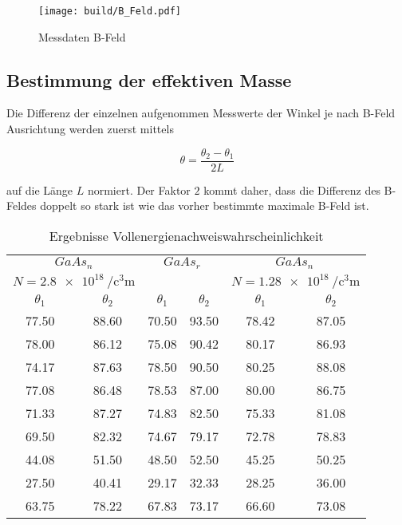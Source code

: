 \begin{figure}[H]
	\centering
	\texttt{[image: build/B\_Feld.pdf]}
	\caption{Messdaten B-Feld}\label{fig:B_Feld}
\end{figure}

\subsection{Bestimmung der effektiven Masse}
Die Differenz der einzelnen aufgenommen Messwerte der Winkel je nach B-Feld Ausrichtung werden zuerst mittels 

\begin{equation}
    \theta=\frac{\theta_2 - \theta_1}{2L} 
\end{equation}

auf die Länge $L$ normiert. 
Der Faktor $2$ kommt daher, dass die Differenz des B-Feldes doppelt so stark ist wie das vorher bestimmte maximale B-Feld ist. 

\begin{table}[H]
	\centering
	\caption{Ergebnisse Vollenergienachweiswahrscheinlichkeit}
	\begin{tabular}{|c c | c c | c c|}
		\toprule
		\multicolumn{2}{|c|}{$GaAs_n$}  & \multicolumn{2}{|c|}{$GaAs_r \, $}  & \multicolumn{2}{|c|}{$GaAs_n \, $}   \\
        \multicolumn{2}{|c|}{$N=\qty[per-mode=fraction]{2.8e18}{\per\cubic\centi\meter} $}  & \multicolumn{2}{|c|}{$ $}  & \multicolumn{2}{|c|}{$N=\qty[per-mode=fraction]{1.28e18}{\per\cubic\centi\meter} $}   \\
        \midrule
        $\theta_1$ & $\theta_2 $ & $\theta_1 $ & $ \theta_2 $ & $\theta_1 $ & $ \theta_2 $ \\
		\midrule
            \num{77.50} & \num{88.60} & \num{70.50} & \num{93.50} & \num{78.42} & \num{87.05} \\
            \num{78.00} & \num{86.12} & \num{75.08} & \num{90.42} & \num{80.17} & \num{86.93} \\
            \num{74.17} & \num{87.63} & \num{78.50} & \num{90.50} & \num{80.25} & \num{88.08} \\
            \num{77.08} & \num{86.48} & \num{78.53} & \num{87.00} & \num{80.00} & \num{86.75} \\
            \num{71.33} & \num{87.27} & \num{74.83} & \num{82.50} & \num{75.33} & \num{81.08} \\
            \num{69.50} & \num{82.32} & \num{74.67} & \num{79.17} & \num{72.78} & \num{78.83} \\
            \num{44.08} & \num{51.50} & \num{48.50} & \num{52.50} & \num{45.25} & \num{50.25} \\
            \num{27.50} & \num{40.41} & \num{29.17} & \num{32.33} & \num{28.25} & \num{36.00} \\
            \num{63.75} & \num{78.22} & \num{67.83} & \num{73.17} & \num{66.60} & \num{73.08} \\
		\bottomrule
	\end{tabular}
	\label{tab:data2}
\end{table}

